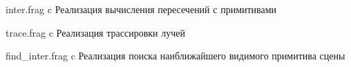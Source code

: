 \begin{appendices}
	{inter.frag} %
	{c} %
	{Реализация вычисления пересечений с примитивами} %

	{trace.frag} %
	{c} %
	{Реализация трассировки лучей} %

	{find_inter.frag} %
	{c} %
	{Реализация поиска наиближайшего видимого примитива сцены} %
	
	
\end{appendices}
	
	
